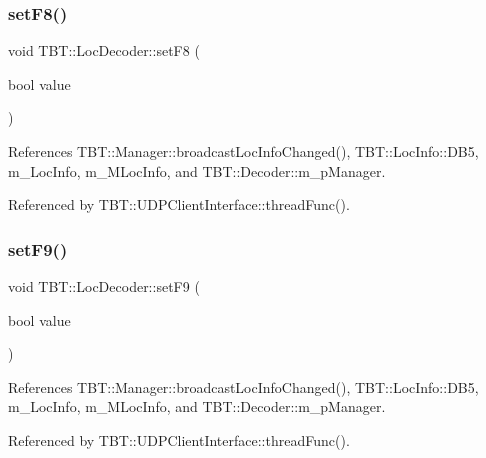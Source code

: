 \subsubsection{\texorpdfstring{set\+F8()}{setF8()}}
{\footnotesize\ttfamily void T\+B\+T\+::\+Loc\+Decoder\+::set\+F8 (\begin{DoxyParamCaption}\item[{bool}]{value }\end{DoxyParamCaption})\hspace{0.3cm}{\ttfamily [inline]}}



References T\+B\+T\+::\+Manager\+::broadcast\+Loc\+Info\+Changed(), T\+B\+T\+::\+Loc\+Info\+::\+D\+B5, m\+\_\+\+Loc\+Info, m\+\_\+\+M\+Loc\+Info, and T\+B\+T\+::\+Decoder\+::m\+\_\+p\+Manager.



Referenced by T\+B\+T\+::\+U\+D\+P\+Client\+Interface\+::thread\+Func().

\mbox{\label{classTBT_1_1LocDecoder_a725b9d78cbdbd1e60a9102ddf5b8aaf3_a725b9d78cbdbd1e60a9102ddf5b8aaf3}} 
\subsubsection{\texorpdfstring{set\+F9()}{setF9()}}
{\footnotesize\ttfamily void T\+B\+T\+::\+Loc\+Decoder\+::set\+F9 (\begin{DoxyParamCaption}\item[{bool}]{value }\end{DoxyParamCaption})\hspace{0.3cm}{\ttfamily [inline]}}



References T\+B\+T\+::\+Manager\+::broadcast\+Loc\+Info\+Changed(), T\+B\+T\+::\+Loc\+Info\+::\+D\+B5, m\+\_\+\+Loc\+Info, m\+\_\+\+M\+Loc\+Info, and T\+B\+T\+::\+Decoder\+::m\+\_\+p\+Manager.



Referenced by T\+B\+T\+::\+U\+D\+P\+Client\+Interface\+::thread\+Func().

\mbox{\label{classTBT_1_1LocDecoder_a7d77fa29a27f1abff7dba21c3cca7ff1_a7d77fa29a27f1abff7dba21c3cca7ff1}} 
